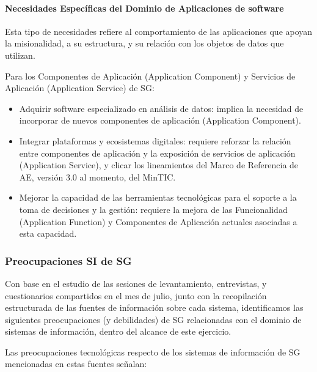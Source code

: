 \documentclass[
	a4paper, %
	12pt, %
]{include/CSSullivanBusinessReport}
\def\tightlist{}
\begin{document}
\paragraph{Necesidades Específicas del Dominio de Aplicaciones de
software}\label{sec:necesidades-especuxedficas-del-dominio-de-aplicaciones-de-software}

Esta tipo de necesidades refiere al comportamiento de las aplicaciones
que apoyan la misionalidad, a su estructura, y su relación con los
objetos de datos que utilizan.

Para los Componentes de Aplicación (Application Component) y Servicios
de Aplicación (Application Service) de SG:

\begin{itemize}
\tightlist
\item
  Adquirir software especializado en análisis de datos: implica la
  necesidad de incorporar de nuevos componentes de aplicación
  (Application Component).
\item
  Integrar plataformas y ecosistemas digitales: requiere reforzar la
  relación entre componentes de aplicación y la exposición de servicios
  de aplicación (Application Service), y clicar los lineamientos del
  Marco de Referencia de AE, versión 3.0 al momento, del MinTIC.
\item
  Mejorar la capacidad de las herramientas tecnológicas para el soporte
  a la toma de decisiones y la gestión: requiere la mejora de las
  Funcionalidad (Application Function) y Componentes de Aplicación
  actuales asociadas a esta capacidad.
\end{itemize}

\subsubsection{Preocupaciones SI de
SG}\label{sec:preocupaciones-si-de-sg}

Con base en el estudio de las sesiones de levantamiento, entrevistas, y
cuestionarios compartidos en el mes de julio, junto con la recopilación
estructurada de las fuentes de información sobre cada sistema,
identificamos las siguientes preocupaciones (y debilidades) de SG
relacionadas con el dominio de sistemas de información, dentro del
alcance de este ejercicio.

Las preocupaciones tecnológicas respecto de los sistemas de información
de SG mencionadas en estas fuentes señalan:
\end{document}
